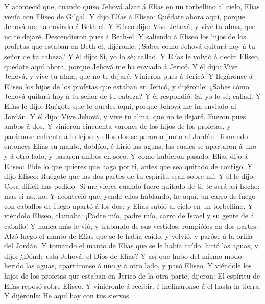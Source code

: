  Y aconteció que, cuando quiso Jehová alzar á Elías en un
torbellino al cielo, Elías venía con Eliseo de Gilgal.  Y
dijo Elías á Eliseo: Quédate ahora aquí, porque Jehová me ha enviado á
Beth-el. Y Eliseo dijo: Vive Jehová, y vive tu alma, que no te dejaré.
Descendieron pues á Beth-el.  Y saliendo á Eliseo los hijos
de los profetas que estaban en Beth-el, dijéronle: ¿Sabes como Jehová
quitará hoy á tu señor de tu cabeza? Y él dijo: Sí, yo lo sé; callad.
 Y Elías le volvió á decir: Eliseo, quédate aquí ahora,
porque Jehová me ha enviado á Jericó. Y él dijo: Vive Jehová, y vive tu
alma, que no te dejaré. Vinieron pues á Jericó.  Y
llegáronse á Eliseo los hijos de los profetas que estaban en Jericó, y
dijéronle: ¿Sabes cómo Jehová quitará hoy á tu señor de tu cabeza? Y él
respondió: Sí, yo lo sé; callad.  Y Elías le dijo: Ruégote
que te quedes aquí, porque Jehová me ha enviado al Jordán. Y él dijo:
Vive Jehová, y vive tu alma, que no te dejaré. Fueron pues ambos á dos.
 Y vinieron cincuenta varones de los hijos de los profetas,
y paráronse enfrente á lo lejos: y ellos dos se pararon junto al Jordán.
 Tomando entonces Elías su manto, doblólo, é hirió las
aguas, las cuales se apartaron á uno y á otro lado, y pasaron ambos en
seco.  Y como hubieron pasado, Elías dijo á Eliseo: Pide lo
que quieres que haga por ti, antes que sea quitado de contigo. Y dijo
Eliseo: Ruégote que las dos partes de tu espíritu sean sobre mí.
 Y él le dijo: Cosa difícil has pedido. Si me vieres cuando
fuere quitado de ti, te será así hecho; mas si no, no.  Y
aconteció que, yendo ellos hablando, he aquí, un carro de fuego con
caballos de fuego apartó á los dos: y Elías subió al cielo en un
torbellino.  Y viéndolo Eliseo, clamaba: ¡Padre mío, padre
mío, carro de Israel y su gente de á caballo! Y nunca más le vió, y
trabando de sus vestidos, rompiólos en dos partes.  Alzó
luego el manto de Elías que se le había caído, y volvió, y paróse á la
orilla del Jordán.  Y tomando el manto de Elías que se le
había caído, hirió las aguas, y dijo: ¿Dónde está Jehová, el Dios de
Elías? Y así que hubo del mismo modo herido las aguas, apartáronse á uno
y á otro lado, y pasó Eliseo.  Y viéndole los hijos de los
profetas que estaban en Jericó de la otra parte, dijeron: El espíritu de
Elías reposó sobre Eliseo. Y viniéronle á recibir, é inclináronse á él
hasta la tierra.  Y dijéronle: He aquí hay con tus siervos

